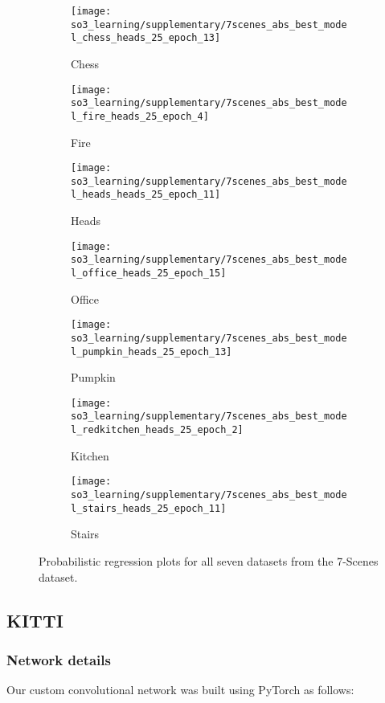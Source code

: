 \begin{figure*}[h!]
	\centering
	\begin{subfigure}[]{0.33\textwidth}
		\texttt{[image: so3\_learning/supplementary/7scenes\_abs\_best\_model\_chess\_heads\_25\_epoch\_13]}
		\caption{Chess}
	\end{subfigure}
	\begin{subfigure}[]{0.33\textwidth} 
		\texttt{[image: so3\_learning/supplementary/7scenes\_abs\_best\_model\_fire\_heads\_25\_epoch\_4]}
		\caption{Fire}
	\end{subfigure}
	\begin{subfigure}[]{0.33\textwidth} 
		\texttt{[image: so3\_learning/supplementary/7scenes\_abs\_best\_model\_heads\_heads\_25\_epoch\_11]}
		\caption{Heads}
	\end{subfigure}
	\begin{subfigure}[]{0.33\textwidth} 
		\texttt{[image: so3\_learning/supplementary/7scenes\_abs\_best\_model\_office\_heads\_25\_epoch\_15]}
		\caption{Office}
	\end{subfigure}
	\begin{subfigure}[]{0.33\textwidth} 
		\texttt{[image: so3\_learning/supplementary/7scenes\_abs\_best\_model\_pumpkin\_heads\_25\_epoch\_13]}
		\caption{Pumpkin}
	\end{subfigure}
	\begin{subfigure}[]{0.33\textwidth} 
		\texttt{[image: so3\_learning/supplementary/7scenes\_abs\_best\_model\_redkitchen\_heads\_25\_epoch\_2]}
		\caption{Kitchen}
	\end{subfigure}
	\begin{subfigure}[]{0.33\textwidth} 
		\texttt{[image: so3\_learning/supplementary/7scenes\_abs\_best\_model\_stairs\_heads\_25\_epoch\_11]}
		\caption{Stairs}
	\end{subfigure}
	
	\caption{Probabilistic regression plots for all seven datasets from the 7-Scenes dataset.}
	\label{fig:7scenes_regression}
\end{figure*}

\subsection{KITTI}
\subsubsection{Network details}
Our custom convolutional network was built using PyTorch as follows:

